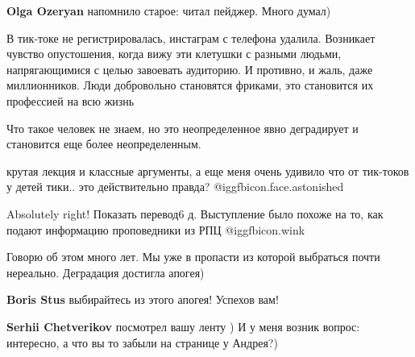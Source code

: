 \begin{itemize}
\textbf{Olga Ozeryan} напомнило старое: читал пейджер. Много думал)


В тик-токе не регистрировалась, инстаграм с телефона удалила. Возникает чувство
опустошения, когда вижу эти клетушки с разными людьми, напрягающимися с целью
завоевать аудиторию. И противно, и жаль, даже миллионников. Люди добровольно
становятся фриками, это становится их профессией на всю жизнь


Что такое человек не знаем, но это неопределенное явно деградирует и становится
еще более неопределенным.

крутая лекция и классные аргументы, а еще меня очень удивило что от тик-токов у
детей тики.. это действительно правда? @igg{fbicon.face.astonished} 

Absolutely right!
Показать перевод6 д.
Выступление было похоже на то, как подают информацию проповедники из РПЦ  @igg{fbicon.wink} 

Говорю об этом много лет.
Мы уже в пропасти из которой выбраться почти нереально.
Деградация достигла апогея)

\textbf{Boris Stus} выбирайтесь из этого апогея! Успехов вам!

\textbf{Serhii Chetverikov} посмотрел вашу ленту
) И у меня возник вопрос: интересно, а что вы то забыли на странице у Андрея?)

\end{itemize} %
